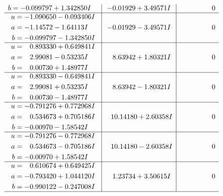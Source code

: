 \documentclass[1p]{elsarticle_modified}
\theoremstyle{definition}
\begin{document}
$$\begin{array}{c|c|c}
\begin{aligned}
b &= -0.099797 + 1.342850 I\end{aligned}
 & -0.01929 + 3.49571 I & \phantom{-0.000000 } 0 \\ \hline\begin{aligned}
u &= -1.090650 - 0.093406 I \\
a &= -1.14572 - 1.64113 I \\
b &= -0.099797 - 1.342850 I\end{aligned}
 & -0.01929 - 3.49571 I & \phantom{-0.000000 } 0 \\ \hline\begin{aligned}
u &= \phantom{-}0.893330 + 0.649841 I \\
a &= \phantom{-}2.99081 - 0.53235 I \\
b &= \phantom{-}0.00730 + 1.48977 I\end{aligned}
 & \phantom{-}8.63942 + 1.80321 I & \phantom{-0.000000 } 0 \\ \hline\begin{aligned}
u &= \phantom{-}0.893330 - 0.649841 I \\
a &= \phantom{-}2.99081 + 0.53235 I \\
b &= \phantom{-}0.00730 - 1.48977 I\end{aligned}
 & \phantom{-}8.63942 - 1.80321 I & \phantom{-0.000000 } 0 \\ \hline\begin{aligned}
u &= -0.791276 + 0.772968 I \\
a &= \phantom{-}0.534673 + 0.705186 I \\
b &= -0.00970 - 1.58542 I\end{aligned}
 & \phantom{-}10.14180 + 2.60358 I & \phantom{-0.000000 } 0 \\ \hline\begin{aligned}
u &= -0.791276 - 0.772968 I \\
a &= \phantom{-}0.534673 - 0.705186 I \\
b &= -0.00970 + 1.58542 I\end{aligned}
 & \phantom{-}10.14180 - 2.60358 I & \phantom{-0.000000 } 0 \\ \hline\begin{aligned}
u &= \phantom{-}0.610674 + 0.649425 I \\
a &= -0.793420 + 1.044120 I \\
b &= -0.990122 - 0.247008 I\end{aligned}
 & \phantom{-}1.23734 + 3.50615 I & \phantom{-0.000000 } 0\\
 \hline 
 \end{array}$$\newpage$$\begin{array}{c|c|c}  

\end{array}$$
\end{document}
